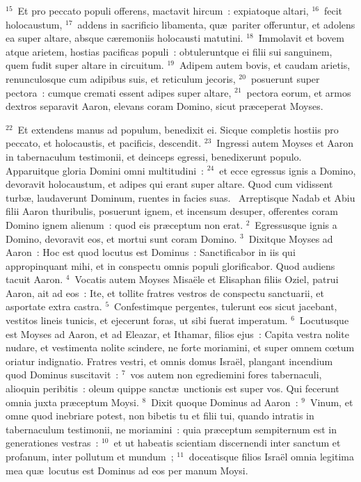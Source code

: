 ${}^{15}$~Et pro peccato populi offerens, mactavit hircum~: expiatoque altari,
${}^{16}$~fecit holocaustum,
${}^{17}$~addens in sacrificio libamenta, qu\ae\ pariter offeruntur, et adolens ea super altare, absque c\ae remoniis holocausti matutini.
${}^{18}$~Immolavit et bovem atque arietem, hostias pacificas populi~: obtuleruntque ei filii sui sanguinem, quem fudit super altare in circuitum.
${}^{19}$~Adipem autem bovis, et caudam arietis, renunculosque cum adipibus suis, et reticulum jecoris,
${}^{20}$~posuerunt super pectora~: cumque cremati essent adipes super altare,
${}^{21}$~pectora eorum, et armos dextros separavit Aaron, elevans coram Domino, sicut pr\ae ceperat Moyses.


${}^{22}$~Et extendens manus ad populum, benedixit ei. Sicque completis hostiis pro peccato, et holocaustis, et pacificis, descendit.
${}^{23}$~Ingressi autem Moyses et Aaron in tabernaculum testimonii, et deinceps egressi, benedixerunt populo. Apparuitque gloria Domini omni multitudini~:
${}^{24}$~et ecce egressus ignis a Domino, devoravit holocaustum, et adipes qui erant super altare. Quod cum vidissent turb\ae , laudaverunt Dominum, ruentes in facies suas.
~Arreptisque Nadab et Abiu filii Aaron thuribulis, posuerunt ignem, et incensum desuper, offerentes coram Domino ignem alienum~: quod eis pr\ae ceptum non erat.
${}^{2}$~Egressusque ignis a Domino, devoravit eos, et mortui sunt coram Domino.
${}^{3}$~Dixitque Moyses ad Aaron~: Hoc est quod locutus est Dominus~: Sanctificabor in iis qui appropinquant mihi, et in conspectu omnis populi glorificabor. Quod audiens tacuit Aaron.
${}^{4}$~Vocatis autem Moyses Misa\"ele et Elisaphan filiis Oziel, patrui Aaron, ait ad eos~: Ite, et tollite fratres vestros de conspectu sanctuarii, et asportate extra castra.
${}^{5}$~Confestimque pergentes, tulerunt eos sicut jacebant, vestitos lineis tunicis, et ejecerunt foras, ut sibi fuerat imperatum.
${}^{6}$~Locutusque est Moyses ad Aaron, et ad Eleazar, et Ithamar, filios ejus~: Capita vestra nolite nudare, et vestimenta nolite scindere, ne forte moriamini, et super omnem cœtum oriatur indignatio. Fratres vestri, et omnis domus Isra\"el, plangant incendium quod Dominus suscitavit~:
${}^{7}$~vos autem non egrediemini fores tabernaculi, alioquin peribitis~: oleum quippe sanct\ae\ unctionis est super vos. Qui fecerunt omnia juxta pr\ae ceptum Moysi.
${}^{8}$~Dixit quoque Dominus ad Aaron~:
${}^{9}$~Vinum, et omne quod inebriare potest, non bibetis tu et filii tui, quando intratis in tabernaculum testimonii, ne moriamini~: quia pr\ae ceptum sempiternum est in generationes vestras~:
${}^{10}$~et ut habeatis scientiam discernendi inter sanctum et profanum, inter pollutum et mundum~;
${}^{11}$~doceatisque filios Isra\"el omnia legitima mea qu\ae\ locutus est Dominus ad eos per manum Moysi.


